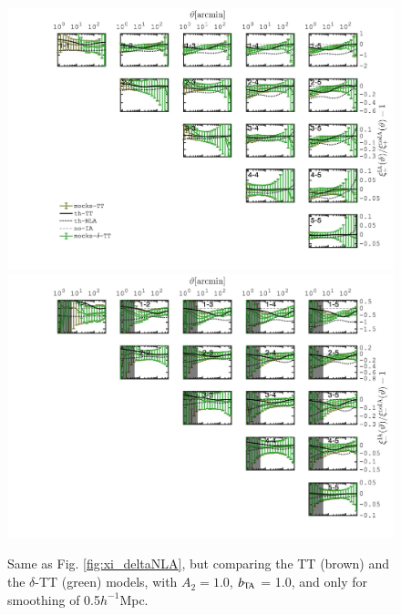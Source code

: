 \begin{figure}
\includegraphics[width=\columnwidth]{graphs/frac_xip_IA1_skysim_deltaTT_srd.jpg}
\includegraphics[width=\columnwidth]{graphs/frac_xim_IA1_skysim_deltaTT_srd.jpg}
\caption{Same as Fig. \ref{fig:xi_deltaNLA}, but comparing the TT (brown) and the $\delta$-TT  (green) models, with $A_2=1.0$, $b_{\rm TA}$ = 1.0, and only for smoothing of 0.5$h^{-1}$Mpc. }
\label{fig:xi_deltaTT}
\end{figure}